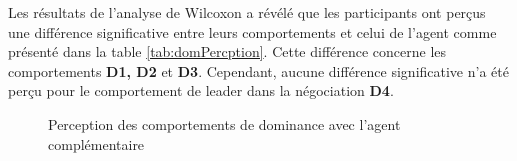 	Les résultats de l'analyse de Wilcoxon a révélé que les participants ont perçus une différence significative entre leurs comportements et celui de l'agent comme présenté dans la table \ref{tab:domPercption}. Cette différence concerne les comportements \textbf{D1, D2} et \textbf{D3}. Cependant, aucune différence significative n'a été perçu pour le comportement de leader dans la négociation \textbf{D4}. 
	\begin{figure}[h]
		\centering
		
		\caption{Perception des comportements de dominance avec l'agent complémentaire}
		\label{fig:comp}
	\end{figure}	
	
